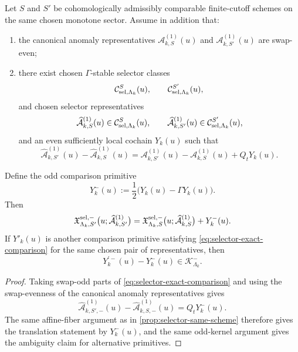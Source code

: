 \documentclass[11pt]{article}
\begin{document}
\begin{theorem}
\label{thm:selector-scheme-stability}
Let \(S\) and \(S'\) be cohomologically admissibly comparable finite-cutoff schemes on the same
chosen monotone sector.
Assume in addition that:
\begin{enumerate}[leftmargin=2em]
\item the canonical anomaly representatives
  \(
  \mathcal A^{(1)}_{k,S}(u)
  \)
  and
  \(
  \mathcal A^{(1)}_{k,S'}(u)
  \)
  are swap-even;
\item there exist chosen \(\Gamma\)-stable selector classes
  \[
  \mathcal C_{{\rm sel},\Lambda_k}^{S}(u),
  \qquad
  \mathcal C_{{\rm sel},\Lambda_k}^{S'}(u),
  \]
  and chosen selector representatives
  \[
  \widehat{\mathcal A}^{(1)}_{k,S}(u)\in\mathcal C_{{\rm sel},\Lambda_k}^{S}(u),
  \qquad
  \widehat{\mathcal A}^{(1)}_{k,S'}(u)\in\mathcal C_{{\rm sel},\Lambda_k}^{S'}(u),
  \]
  and an even sufficiently local cochain \(Y_k(u)\) such that
  \begin{equation}
  \widehat{\mathcal A}^{(1)}_{k,S'}(u)
  -
  \widehat{\mathcal A}^{(1)}_{k,S}(u)
  =
  \mathcal A^{(1)}_{k,S'}(u)
  -
  \mathcal A^{(1)}_{k,S}(u)
  +
  Q_tY_k(u).
  \label{eq:selector-exact-comparison}
  \end{equation}
\end{enumerate}
Define the odd comparison primitive
\[
Y^-_k(u)
:=
\frac12\Big(
Y_k(u)-\Gamma Y_k(u)
\Big).
\]
Then
\[
\mathfrak X_{{\Lambda_k},S'}^{{\rm sel},-}
\big(u;\widehat{\mathcal A}^{(1)}_{k,S'}\big)
=
\mathfrak X_{{\Lambda_k},S}^{{\rm sel},-}
\big(u;\widehat{\mathcal A}^{(1)}_{k,S}\big)
+
Y^-_k(u).
\]
If \(Y'_k(u)\) is another comparison primitive satisfying
\eqref{eq:selector-exact-comparison} for the same chosen pair of representatives, then
\[
Y_k^{\prime -}(u)-Y^-_k(u)\in \mathcal K^-_{\Lambda_k}.
\]
\end{theorem}

\begin{proof}
Taking swap-odd parts of \eqref{eq:selector-exact-comparison} and using the swap-evenness of the
canonical anomaly representatives gives
\[
\widehat{\mathcal A}^{(1)}_{k,S',-}(u)
- 
\widehat{\mathcal A}^{(1)}_{k,S,-}(u)
=
Q_tY^-_k(u).
\]
The same affine-fiber argument as in \cref{prop:selector-same-scheme} therefore gives the
translation statement by \(Y^-_k(u)\), and the same odd-kernel argument gives the ambiguity claim
for alternative primitives.
\end{proof}
\end{document}
